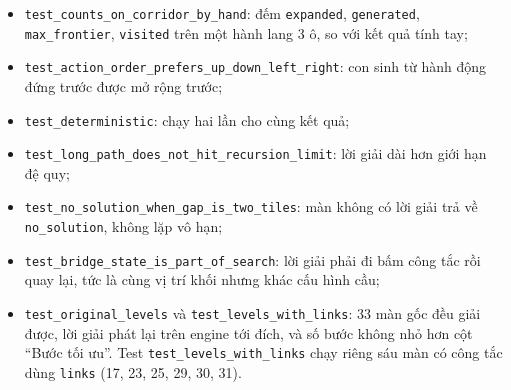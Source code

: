 \begin{itemize}
\tightlist
\item
  \texttt{test\_\allowbreak{}counts\_\allowbreak{}on\_\allowbreak{}corridor\_\allowbreak{}by\_\allowbreak{}hand}: đếm \texttt{expanded}, \texttt{generated}, \texttt{max\_\allowbreak{}frontier}, \texttt{visited} trên một hành lang 3 ô, so với kết quả tính tay;
\item
  \texttt{test\_\allowbreak{}action\_\allowbreak{}order\_\allowbreak{}prefers\_\allowbreak{}up\_\allowbreak{}down\_\allowbreak{}left\_\allowbreak{}right}: con sinh từ hành động đứng trước được mở rộng trước;
\item
  \texttt{test\_\allowbreak{}deterministic}: chạy hai lần cho cùng kết quả;
\item
  \texttt{test\_\allowbreak{}long\_\allowbreak{}path\_\allowbreak{}does\_\allowbreak{}not\_\allowbreak{}hit\_\allowbreak{}recursion\_\allowbreak{}limit}: lời giải dài hơn giới hạn đệ quy;
\item
  \texttt{test\_\allowbreak{}no\_\allowbreak{}solution\_\allowbreak{}when\_\allowbreak{}gap\_\allowbreak{}is\_\allowbreak{}two\_\allowbreak{}tiles}: màn không có lời giải trả về \texttt{no\_\allowbreak{}solution}, không lặp vô hạn;
\item
  \texttt{test\_\allowbreak{}bridge\_\allowbreak{}state\_\allowbreak{}is\_\allowbreak{}part\_\allowbreak{}of\_\allowbreak{}search}: lời giải phải đi bấm công tắc rồi quay lại, tức là cùng vị trí khối nhưng khác cấu hình cầu;
\item
  \texttt{test\_\allowbreak{}original\_\allowbreak{}levels} và \texttt{test\_\allowbreak{}levels\_\allowbreak{}with\_\allowbreak{}links}: 33 màn gốc đều giải được, lời giải phát lại trên engine tới đích, và số bước không nhỏ hơn cột ``Bước tối ưu''. Test \texttt{test\_\allowbreak{}levels\_\allowbreak{}with\_\allowbreak{}links} chạy riêng sáu màn có công tắc dùng \texttt{links} (17, 23, 25, 29, 30, 31).
\end{itemize}
